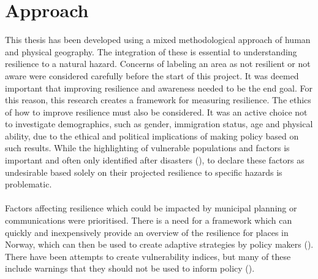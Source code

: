 \section{Approach}

This thesis has been developed using a mixed methodological approach of human and physical geography. The integration of these is essential to understanding resilience to a natural hazard. Concerns of labeling an area as not resilient or not aware were considered carefully before the start of this project.  It was deemed important that improving resilience and awareness needed to be the end goal. For this reason, this research creates a framework for measuring resilience. The ethics of how to improve resilience must also be considered. It was an active choice not to investigate demographics, such as gender, immigration status, age and physical ability, due to the ethical and political implications of making policy based on such results. While the highlighting of vulnerable populations and factors is important and often only identified after disasters (\cite{cutter_community_2020}), to declare these factors as undesirable based solely on their projected resilience to specific hazards is problematic. 

\paragraph{}
Factors affecting resilience which could be impacted by municipal planning or communications were prioritised. There is a need for a framework which can quickly and inexpensively provide an overview of the resilience for places in Norway, which can then be used to create adaptive strategies by policy makers (\cite{opach_seeking_2020}). There have been attempts to create vulnerability indices, but many of these include warnings that they should not be used to inform policy (\cite{opach_seeking_2020}). 


